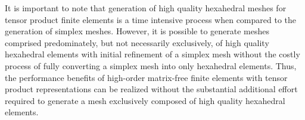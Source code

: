 It is important to note that generation of high quality hexahedral meshes for tensor product finite elements is a time intensive process when compared to the generation of simplex meshes.
However, it is possible to generate meshes comprised predominately, but not necessarily exclusively, of high quality hexahedral elements with initial refinement of a simplex mesh without the costly process of fully converting a simplex mesh into only hexahedral elements.
Thus, the performance benefits of high-order matrix-free finite elements with tensor product representations can be realized without the substantial additional effort required to generate a mesh exclusively composed of high quality hexahedral elements.